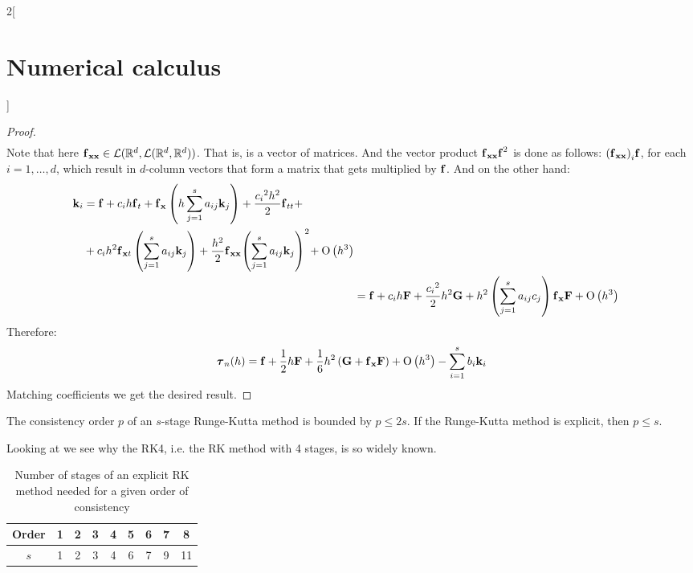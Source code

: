 \documentclass[../../../main_math.tex]{subfiles}
\begin{document}
\begin{multicols}{2}[\section{Numerical calculus}]
\begin{proof}
\begin{align*}
    \end{align*}
    Note that here $\boldsymbol{\mathrm{f}}_{\boldsymbol{\mathrm{xx}}}\in\mathcal{L}(\mathbb{R}^d,\mathcal{L}(\mathbb{R}^d,\mathbb{R}^d))$. That is, is a vector of matrices. And the vector product ${\boldsymbol{\mathrm{f}}_{\boldsymbol{\mathrm{xx}}}}\boldsymbol{\mathrm{f}}^2$ is done as follows: ${(\boldsymbol{\mathrm{f}}_{\boldsymbol{\mathrm{xx}}})}_i\boldsymbol{\mathrm{f}}$, for each $i=1,\ldots,d$, which result in $d$-column vectors that form a matrix that gets multiplied by $\boldsymbol{\mathrm{f}}$.
    And on the other hand:
    \begin{align*}
      \begin{split}
        \boldsymbol{\mathrm{k}}_i & =\boldsymbol{\mathrm{f}}+c_i h\boldsymbol{\mathrm{f}}_t+\boldsymbol{\mathrm{f}}_{\boldsymbol{\mathrm{x}}}\left(h\sum_{j=1}^{s}a_{ij}\boldsymbol{\mathrm{k}}_j\right)+\frac{{c_i}^2 h^2}{2}\boldsymbol{\mathrm{f}}_{tt}+\\
        &+c_i h^2\boldsymbol{\mathrm{f}}_{\boldsymbol{\mathrm{x}}t}\left(\sum_{j=1}^{s}a_{ij}\boldsymbol{\mathrm{k}}_j\right)+\frac{h^2}{2}\boldsymbol{\mathrm{f}}_{\boldsymbol{\mathrm{xx}}}{\left(\sum_{j=1}^{s}a_{ij}\boldsymbol{\mathrm{k}}_j\right)}^2\!+\mathrm{O}\left(h^3\right)
      \end{split} \\
       & =\boldsymbol{\mathrm{f}}+c_i h\boldsymbol{\mathrm{F}}+\frac{{c_i}^2}{2}h^2\boldsymbol{\mathrm{G}}+h^2\left(\sum_{j=1}^{s}a_{ij}c_j\right)\boldsymbol{\mathrm{f}}_{\boldsymbol{\mathrm{x}}}\boldsymbol{\mathrm{F}}+\mathrm{O}\left(h^3\right)                                       \\
    \end{align*}
    Therefore:
    $$\boldsymbol{\mathrm{\tau}}_{n}(h)=\boldsymbol{\mathrm{f}}+\frac{1}{2}h\boldsymbol{\mathrm{F}}+\frac{1}{6}h^2\left(\boldsymbol{\mathrm{G}}+\boldsymbol{\mathrm{f}}_{\boldsymbol{\mathrm{x}}}\boldsymbol{\mathrm{F}}\right)+\mathrm{O}\left(h^3\right)-\sum_{i=1}^sb_i\boldsymbol{\mathrm{k}}_i$$
    Matching coefficients we get the desired result.
  \end{proof}
  \begin{lemma}
    The consistency order $p$ of an $s$-stage Runge-Kutta method is bounded by $p\leq 2 s$. If the Runge-Kutta method is explicit, then $p\leq s$.
  \end{lemma}
  \begin{remark}
    Looking at  we see why the RK4, i.e. the RK method with 4 stages, is so widely known.
  \end{remark}
  \begin{table}[H]
    \centering
    \begin{tabular}{c|cccccccc}
      Order & 1 & 2 & 3 & 4 & 5 & 6 & 7 & 8  \\
      \hline
      $s$   & 1 & 2 & 3 & 4 & 6 & 7 & 9 & 11
    \end{tabular}
    \caption{Number of stages of an explicit RK method needed for a given order of consistency}
    \label{NC:stages-orderRK}
  \end{table}

\end{multicols}
\end{document}
